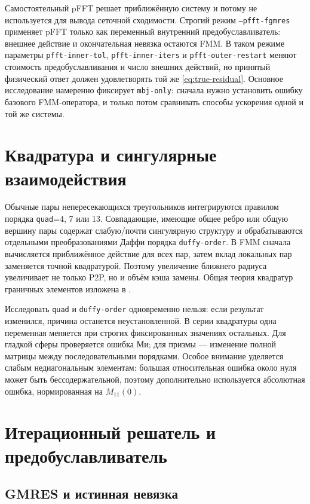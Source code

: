 \documentclass[12pt,a4paper]{article}
\begin{document}
Самостоятельный pFFT решает приближённую систему и потому не используется для
вывода сеточной сходимости. Строгий режим \texttt{--pfft-fgmres} применяет
pFFT только как переменный внутренний предобуславливатель: внешнее действие и
окончательная невязка остаются FMM. В таком режиме параметры
\texttt{pfft-inner-tol}, \texttt{pfft-inner-iters} и
\texttt{pfft-outer-restart} меняют стоимость предобуславливания и число внешних
действий, но принятый физический ответ должен удовлетворять той же
\eqref{eq:true-residual}. Основное исследование намеренно фиксирует
\texttt{mbj-only}: сначала нужно установить ошибку базового FMM-оператора, и
только потом сравнивать способы ускорения одной и той же системы.

\section{Квадратура и сингулярные взаимодействия}

Обычные пары непересекающихся треугольников интегрируются правилом порядка
\texttt{quad}=4, 7 или 13. Совпадающие, имеющие общее ребро или общую вершину
пары содержат слабую/почти сингулярную структуру и обрабатываются отдельными
преобразованиями Даффи порядка \texttt{duffy-order}. В FMM сначала вычисляется
приближённое действие для всех пар, затем вклад локальных пар заменяется точной
квадратурой. Поэтому увеличение ближнего радиуса увеличивает не только P2P,
но и объём кэша замены. Общая теория квадратур граничных элементов изложена в
\cite{sauter2011}.

Исследовать \texttt{quad} и \texttt{duffy-order} одновременно нельзя: если
результат изменился, причина останется неустановленной. В серии квадратуры одна
переменная меняется при строгих фиксированных значениях остальных. Для гладкой
сферы проверяется ошибка Ми; для призмы --- изменение полной матрицы между
последовательными порядками. Особое внимание уделяется слабым недиагональным
элементам: большая относительная ошибка около нуля может быть бессодержательной,
поэтому дополнительно используется абсолютная ошибка, нормированная на
$M_{11}(0)$.

\section{Итерационный решатель и предобуславливатель}

\subsection{GMRES и истинная невязка}
\end{document}
